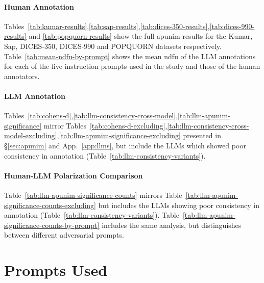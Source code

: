 \documentclass[manuscript,screen,review,anonymous]{acmart}
\theoremstyle{acmplain}
\theoremstyle{researchquestionstyle}
\begin{document}







\paragraph{Human Annotation} Tables~\ref{tab:kumar-results},\ref{tab:sap-results},\ref{tab:dices-350-results},\ref{tab:dices-990-results} and \ref{tab:popquorn-results} show the full apunim results for the Kumar, Sap, DICES-350, DICES-990 and POPQUORN datasets respectively. Table~\ref{tab:mean-ndfu-by-prompt} shows the mean \ac{ndfu} of the LLM annotations for each of the five instruction prompts used in the study and those of the human annotators.




\paragraph{LLM Annotation}
Tables~\ref{tab:cohens-d},\ref{tab:llm-consistency-cross-model},\ref{tab:llm-apunim-significance} mirror Tables~\ref{tab:cohens-d-excluding},\ref{tab:llm-consistency-cross-model-excluding},\ref{tab:llm-apunim-significance-excluding} presented in \S\ref{sec:apunim} and App.~\ref{app:llms}, but include the LLMs which showed poor consistency in annotation (Table~\ref{tab:llm-consistency-variants}).



\paragraph{Human-LLM Polarization Comparison} Table~\ref{tab:llm-apunim-significance-counts} mirrors Table~\ref{tab:llm-apunim-significance-counts-excluding} but includes the LLMs showing poor consistency in annotation (Table~\ref{tab:llm-consistency-variants}). Table~\ref{tab:llm-apunim-significance-counts-by-prompt} includes the same analysis, but distinguishes between different adversarial prompts.


\section{Prompts Used}
\label{app:prompts}
\end{document}
